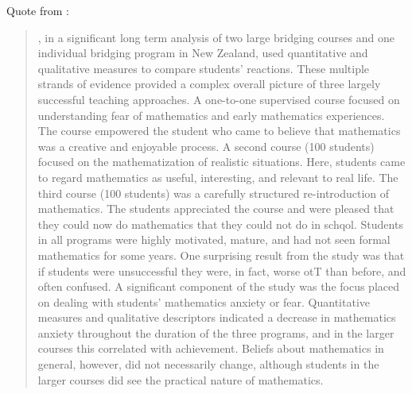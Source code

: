 \documentclass[twoside,12pt,a4paper]{report}
\begin{document}
Quote from \cite{Galligan2008}:
\begin{quote}
, in a significant long term analysis of two large bridging
courses and one individual bridging program in New Zealand, used quantitative
and qualitative measures to compare students' reactions. These multiple strands of
evidence provided a complex overall picture of three largely successful teaching
approaches. A one-to-one supervised course focused on understanding fear of
mathematics and early mathematics experiences. The course empowered the
student who came to believe that mathematics was a creative and enjoyable
process. A second course (100 students) focused on the mathematization of
realistic situations. Here, students came to regard mathematics as useful,
interesting, and relevant to real life. The third course (100 students) was a carefully
structured re-introduction of mathematics. The students appreciated the course and
were pleased that they could now do mathematics that they could not do in schqol.
Students in all programs were highly motivated, mature, and had not seen formal
mathematics for some years. One surprising result from the study was that if
students were unsuccessful they were, in fact, worse otT than before, and often
confused. A significant component of the study was the focus placed on dealing
with students' mathematics anxiety or fear. Quantitative measures and qualitative
descriptors indicated a decrease in mathematics anxiety throughout the duration of
the three programs, and in the larger courses this correlated with achievement.
Beliefs about mathematics in general, however, did not necessarily change,
although students in the larger courses did see the practical nature of mathematics.
\end{quote}
\end{document}
